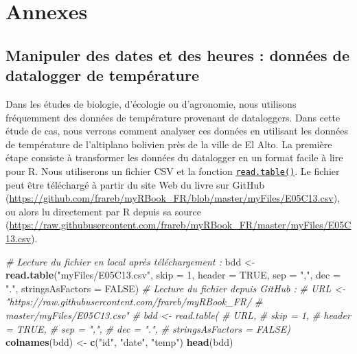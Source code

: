 \documentclass[
]{book}
\newenvironment{Shaded}{\begin{snugshade}}{\end{snugshade}}
\newcommand{\CommentTok}[1]{\textcolor[rgb]{0.56,0.35,0.01}{\textit{#1}}}
\newcommand{\DataTypeTok}[1]{\textcolor[rgb]{0.13,0.29,0.53}{#1}}
\newcommand{\DecValTok}[1]{\textcolor[rgb]{0.00,0.00,0.81}{#1}}
\newcommand{\KeywordTok}[1]{\textcolor[rgb]{0.13,0.29,0.53}{\textbf{#1}}}
\newcommand{\NormalTok}[1]{#1}
\newcommand{\OtherTok}[1]{\textcolor[rgb]{0.56,0.35,0.01}{#1}}
\newcommand{\StringTok}[1]{\textcolor[rgb]{0.31,0.60,0.02}{#1}}
\begin{document}
\hypertarget{part-annexes}{%
\part{Annexes}\label{part-annexes}}

\hypertarget{studyCase001}{%
\chapter{Manipuler des dates et des heures : données de datalogger de température}\label{studyCase001}}

Dans les études de biologie, d'écologie ou d'agronomie, nous utilisons fréquemment des données de température provenant de dataloggers. Dans cette étude de cas, nous verrons comment analyser ces données en utilisant les données de température de l'altiplano bolivien près de la ville de El Alto. La première étape consiste à transformer les données du datalogger en un format facile à lire pour R. Nous utiliserons un fichier CSV et la fonction \protect\hyperlink{import}{\texttt{read.table()}}. Le fichier peut être téléchargé à partir du site Web du livre sur GitHub (\url{https://github.com/frareb/myRBook_FR/blob/master/myFiles/E05C13.csv}), ou alors lu directement par R depuis sa source (\url{https://raw.githubusercontent.com/frareb/myRBook_FR/master/myFiles/E05C13.csv}).

\begin{Shaded}
\begin{Highlighting}[]
\CommentTok{# Lecture du fichier en local après téléchargement : }
\NormalTok{bdd <-}\StringTok{ }\KeywordTok{read.table}\NormalTok{(}\StringTok{"myFiles/E05C13.csv"}\NormalTok{, }\DataTypeTok{skip =} \DecValTok{1}\NormalTok{, }\DataTypeTok{header =} \OtherTok{TRUE}\NormalTok{, }
  \DataTypeTok{sep =} \StringTok{","}\NormalTok{, }\DataTypeTok{dec =} \StringTok{"."}\NormalTok{, }\DataTypeTok{stringsAsFactors =} \OtherTok{FALSE}\NormalTok{)}
\CommentTok{# Lecture du fichier depuis GitHub : }
\CommentTok{# URL <- "https://raw.githubusercontent.com/frareb/myRBook_FR/}
\CommentTok{#   master/myFiles/E05C13.csv"}
\CommentTok{# bdd <- read.table(}
\CommentTok{#   URL, }
\CommentTok{#   skip = 1, }
\CommentTok{#   header = TRUE,}
\CommentTok{#   sep = ",",}
\CommentTok{#   dec = ".",}
\CommentTok{#   stringsAsFactors = FALSE)}
\KeywordTok{colnames}\NormalTok{(bdd) <-}\StringTok{ }\KeywordTok{c}\NormalTok{(}\StringTok{"id"}\NormalTok{, }\StringTok{"date"}\NormalTok{, }\StringTok{"temp"}\NormalTok{)}
\KeywordTok{head}\NormalTok{(bdd)}
\end{Highlighting}
\end{Shaded}
\end{document}
